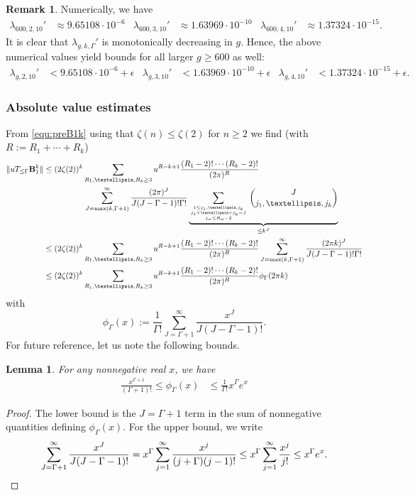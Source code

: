\documentclass[12pt]{amsart}
\newtheorem{lem}[thm]{Lemma}
\theoremstyle{definition}
\newtheorem{rem}[thm]{Remark}
\numberwithin{equation}{section}
\newcommand{\bB}{\mathbf{B}}
\newcommand{\numcheck}[1]{\cite[Computation #1]{SupplementaryNotebook}}
\theoremstyle{definition} %
\theoremstyle{remark}
\begin{document}
\begin{rem}\label{rem:err subleading mono}
    Numerically, we have \numcheck{LAEVAL}
    \begin{align*}
        \lambda_{600,2,10}' &\approx 9.65108\cdot 10^{-6} 
        &
        \lambda_{600,3,10}' &\approx 1.63969\cdot 10^{-10}
        &
        \lambda_{600,4,10}' &\approx 1.37324\cdot 10^{-15}
        .
    \end{align*}
It is clear that $\lambda_{g,k,\Gamma}'$ is monotonically decreasing in $g$.
Hence, the above numerical values yield bounds for all larger $g\geq 600$ as well:
\begin{align*}
    \lambda_{g,2,10}' &< 9.65108\cdot 10^{-6} +\epsilon
    &
    \lambda_{g,3,10}' &< 1.63969\cdot 10^{-10}+\epsilon
    &
    \lambda_{g,4,10}' &< 1.37324\cdot 10^{-15}+\epsilon
    .
\end{align*}
\end{rem}
\subsubsection{Absolute value estimates}\label{sec:absolute estimates}
From \eqref{equ:preB1k} using that $\zeta(n)\leq \zeta(2)$ for $n\geq 2$ we find (with $R:=R_1+\cdots+R_k$)
\begin{align*}
  \|u T_{\leq \Gamma} \bB_1^k\| &\leq 
  (2\zeta(2))^k 
  \sum_{R_1,\dots,R_k\geq 3}
  u^{R-k+1} \frac{(R_1-2)!\cdots (R_k-2)!}{(2\pi)^R}
  \\&\quad\quad\quad\quad\quad
  \sum_{J=\max(k,\Gamma+1)}^\infty
  \frac{(2\pi)^J}{J(J-\Gamma-1)!\Gamma!} \underbrace{\sum_{1\leq j_1,\dots,j_k\atop {j_1+\dots+j_k=J \atop j_\alpha\leq R_\alpha-2}}\binom{J}{j_1,\dots,j_k} }_{\leq k^J}
  \\&\leq
  (2\zeta(2))^k 
  \sum_{R_1,\dots,R_k\geq 3}
  u^{R-k+1} \frac{(R_1-2)!\cdots (R_k-2)!}{(2\pi)^R}
  \sum_{J=\max(k,\Gamma+1)}^\infty
  \frac{(2\pi k)^J}{J(J-\Gamma-1)!\Gamma!}
  \\&\leq
  (2\zeta(2))^k 
  \sum_{R_1,\dots,R_k\geq 3}
  u^{R-k+1} \frac{(R_1-2)!\cdots (R_k-2)!}{(2\pi)^R}
  \phi_\Gamma(2\pi k)
\end{align*}
with 
\[
  \phi_\Gamma(x):=
  \frac{1}{\Gamma!}
  \sum_{J=\Gamma+1}^\infty
  \frac{x^J}{J(J-\Gamma-1)!}.  
\]
For future reference, let us note the following bounds. 
\begin{lem} \label{lem:phibd}
For any nonnegative real $x$, we have
 \begin{align*}
    \frac{x^{\Gamma+1}}{(\Gamma+1)!} \leq \phi_\Gamma(x)&\leq \frac{1}{\Gamma!} x^\Gamma e^x 
\end{align*}   
\end{lem}
\begin{proof}
The lower bound is the $J = \Gamma + 1$ term in the sum of nonnegative quantities defining $\phi_\Gamma(x)$. For the upper bound, we write 
\[ \sum_{J=\Gamma+1}^\infty
  \frac{x^J}{J(J-\Gamma-1)!} = x^{\Gamma} \sum_{j = 1}^\infty \frac{x^j}{(j + \Gamma)(j-1)!} \leq x^\Gamma\sum_{j=1}^\infty \frac{x^j}{j!} \leq x^\Gamma e^x. \qedhere\]
\end{proof}
\end{document}
